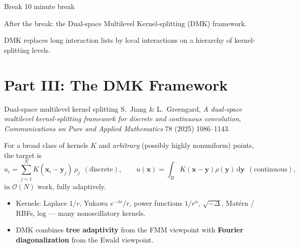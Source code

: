 \documentclass[aspectratio=169,11pt]{beamer}
\newcommand{\cO}{\mathcal{O}}
\newcommand{\dd}{\,\mathrm d}
\newcommand{\x}{\bm{x}}
\newcommand{\y}{\bm{y}}
\newcommand{\hl}[1]{{\color{CCMorange}\textbf{#1}}}
\newcommand{\gray}[1]{{\color{mygray}#1}}
\begin{document}
\begin{frame}{Break}
\centering
\vspace{16mm}
{\Large 10 minute break}

\vspace{8mm}
After the break: the Dual-space Multilevel Kernel-splitting (DMK) framework.

\vspace{4mm}
{\small DMK replaces long interaction lists by local interactions on a hierarchy
of kernel-splitting levels.}
\end{frame}

\section{Part III: The DMK Framework}

\begin{frame}{Dual-space multilevel kernel splitting}
\small
\gray{S.\ Jiang \& L.\ Greengard, \emph{A dual-space multilevel kernel-splitting framework for discrete and continuous convolution}, \emph{Communications on Pure and Applied Mathematics} 78 (2025) 1086--1143.}
\vspace{2mm}

For a broad class of kernels \(K\) and \emph{arbitrary} (possibly highly
nonuniform) points, the target is
\[
  u_i=\sum_{j=1}^N K(\x_i-\y_j)\,\rho_j\ \ (\text{discrete}),\qquad
  u(\x)=\int_B K(\x-\y)\rho(\y)\dd\y\ \ (\text{continuous}),
\]
in \hl{\(\cO(N)\)} work, fully adaptively.
\begin{itemize}
  \item Kernels: Laplace \(1/r\), Yukawa \(e^{-\lambda r}/r\), power functions \(1/r^\alpha\), \(\sqrt{-\Delta}\), Mat\'ern / RBFs, log --- many nonoscillatory kernels.
  \item DMK combines \hl{tree adaptivity} from the FMM viewpoint with
  \hl{Fourier diagonalization} from the Ewald viewpoint.
\end{itemize}
\end{frame}
\end{document}
